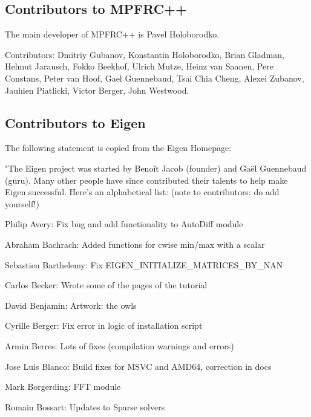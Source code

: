 \subsection{Contributors to MPFRC++}
\label{Contributors to MPFRC++}
The main developer of MPFRC++ is Pavel Holoborodko.

Contributors:
Dmitriy Gubanov, Konstantin Holoborodko, Brian Gladman, 
Helmut Jarausch, Fokko Beekhof, Ulrich Mutze, Heinz van Saanen, 
Pere Constans, Peter van Hoof, Gael Guennebaud, Tsai Chia Cheng, 
Alexei Zubanov, Jauhien Piatlicki, Victor Berger, John Westwood.


%
%


\subsection{Contributors to Eigen}
\label{Contributors to Eigen}

The following statement is copied from the Eigen Homepage:

\vpara
"The Eigen project was started by Beno\^{i}t Jacob  (founder) and Ga\"{e}l Guennebaud (guru). Many other people have since contributed their talents to help make Eigen successful. Here's an alphabetical list: (note to contributors: do add yourself!) 

\vpara
Philip Avery:  Fix bug and add functionality to AutoDiff module  

Abraham Bachrach:  Added functions for cwise min/max with a scalar  

Sebastien Barthelemy:  Fix EIGEN\_INITIALIZE\_MATRICES\_BY\_NAN  

Carlos Becker:  Wrote some of the pages of the tutorial  

David Benjamin:  Artwork: the owls  

Cyrille Berger:  Fix error in logic of installation script  

Armin Berres:  Lots of fixes (compilation warnings and errors)  

Jose Luis Blanco:  Build fixes for MSVC and AMD64, correction in docs  

Mark Borgerding:  FFT module  

Romain Bossart:  Updates to Sparse solvers  

